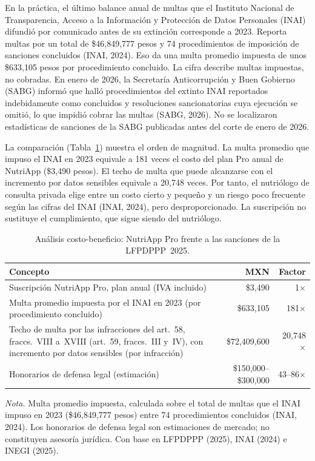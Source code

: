\documentclass[12pt, a4paper]{article}
\begin{document}
En la práctica, el último balance anual de multas que el Instituto
Nacional de Transparencia, Acceso a la Información y Protección de Datos
Personales (INAI) difundió por comunicado antes de su extinción
corresponde a 2023. Reporta multas por un total de \$46,849,777 pesos y
74 procedimientos de imposición de sanciones concluidos (INAI, 2024).
Eso da una multa promedio impuesta de unos \$633,105 pesos por
procedimiento concluido. La cifra describe multas impuestas, no
cobradas. En enero de 2026, la Secretaría Anticorrupción y Buen Gobierno
(SABG) informó que halló procedimientos del extinto INAI reportados
indebidamente como concluidos y resoluciones sancionatorias cuya
ejecución se omitió, lo que impidió cobrar las multas (SABG, 2026). No
se localizaron estadísticas de sanciones de la SABG publicadas antes del
corte de enero de 2026.
 
La comparación (Tabla~\ref{tab:costo-beneficio}) muestra el orden de
magnitud. La multa promedio que impuso el INAI en 2023 equivale a 181
veces el costo del plan Pro anual de NutriApp (\$3,490 pesos). El techo
de multa que puede alcanzarse con el incremento por datos sensibles
equivale a 20,748 veces. Por tanto, el nutriólogo de consulta privada elige
entre un costo cierto y pequeño y un riesgo poco frecuente según las
cifras del INAI (INAI, 2024), pero desproporcionado. La suscripción no
sustituye el cumplimiento, que sigue siendo del nutriólogo.
 
\begin{table}[!htbp]
  \centering
  \caption{Análisis costo-beneficio: NutriApp Pro frente a las sanciones de la LFPDPPP~2025.}
  \label{tab:costo-beneficio}
  \begin{tabularx}{\textwidth}{X r r}
    \toprule
    \textbf{Concepto} & \textbf{MXN} & \textbf{Factor} \\
    \midrule
    Suscripción NutriApp Pro, plan anual (IVA incluido) & \$3,490 & 1$\times$ \\
    Multa promedio impuesta por el INAI en 2023 (por procedimiento concluido) & \$633,105 & 181$\times$ \\
    Techo de multa por las infracciones del art.~58, fraccs.~VIII a~XVIII (art.~59, fraccs.~III y~IV), con incremento por datos sensibles (por infracción) & \$72,409,600 & 20,748$\times$ \\
    Honorarios de defensa legal (estimación) & \$150,000--\$300,000 & 43--86$\times$ \\
    \bottomrule
  \end{tabularx}
  \begin{flushleft}
    \small\textit{Nota.} Multa promedio impuesta, calculada sobre el total
    de multas que el INAI impuso en 2023 (\$46,849,777 pesos) entre 74
    procedimientos concluidos (INAI, 2024). Los honorarios de defensa legal
    son estimaciones de mercado; no constituyen asesoría jurídica. Con base en LFPDPPP (2025), INAI (2024) e INEGI (2025).
  \end{flushleft}
\end{table}
\end{document}
